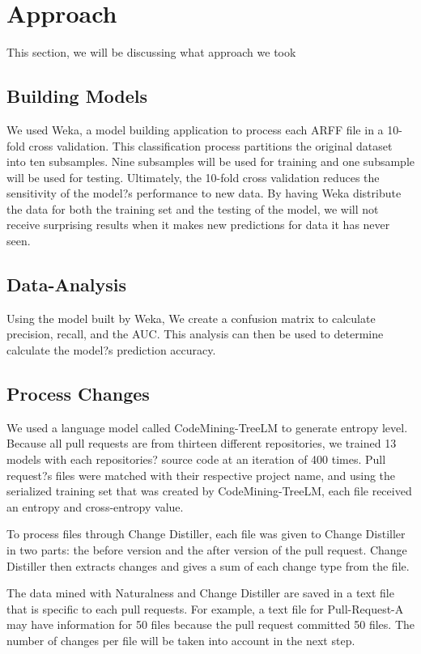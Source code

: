 \documentclass[10pt, conference]{IEEEtran}
\begin{document}
\section{Approach}
This section, we will be discussing what approach we took

\subsection{Building Models}
We used Weka, a model building application to process each ARFF file in a 10-fold cross validation. This classification process partitions the original dataset into ten subsamples. Nine subsamples will be used for training and one subsample will be used for testing. Ultimately, the 10-fold cross validation reduces the sensitivity of the model?s performance to new data. By having Weka distribute the data for both the training set and the testing of the model, we will not receive surprising results when it makes new predictions for data it has never seen.

\subsection{Data-Analysis}
Using the model built by Weka, We create a confusion matrix to calculate precision, recall, and the AUC. This analysis can then be used to determine calculate the model?s prediction accuracy.

\subsection{Process Changes}
We used a language model called CodeMining-TreeLM to generate entropy level. Because all pull requests are from thirteen different repositories, we trained 13 models with each repositories? source code at an iteration of 400 times. Pull request?s files were matched with their respective project name, and using the serialized training set that was created by CodeMining-TreeLM, each file received an entropy and cross-entropy value.

To process files through Change Distiller, each file was given to Change Distiller in two parts: the before version and the after version of the pull request. Change Distiller then extracts changes and gives a sum of each change type from the file. 

The data mined with Naturalness and Change Distiller are saved in a text file that is specific to each pull requests. For example, a text file for Pull-Request-A may have information for 50 files because the pull request committed 50 files. The number of changes per file will be taken into account in the next step.
\end{document}
